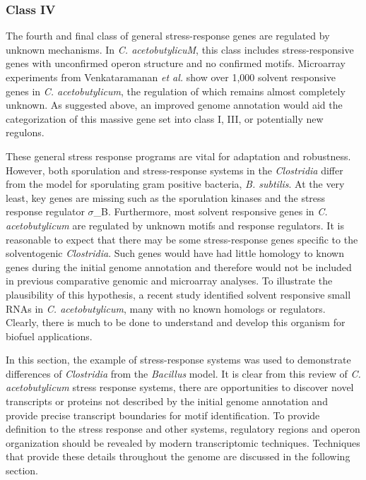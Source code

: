 \subsubsection{Class IV}
The fourth and final class of general stress-response genes are regulated by unknown mechanisms.\cite{11} In \textit{C. acetobutylicuM}, this class includes stress-responsive genes with unconfirmed operon structure and no confirmed motifs. Microarray experiments from Venkataramanan \textit{et al.} show over 1,000 solvent responsive genes in \textit{C. acetobutylicum}, the regulation of which remains almost completely unknown.\cite{42} As suggested above, an improved genome annotation would aid the categorization of this massive gene set into class I, III, or potentially new regulons.

These general stress response programs are vital for adaptation and robustness. However, both sporulation and stress-response systems in the \textit{Clostridia} differ from the model for sporulating gram positive bacteria, \textit{B. subtilis}.\cite{126} At the very least, key genes are missing such as the sporulation kinases and the stress response regulator $\sigma$_B.\cite{126} Furthermore, most solvent responsive genes in \textit{C. acetobutylicum} are regulated by unknown motifs and response regulators.\cite{42} It is reasonable to expect that there may be some stress-response genes specific to the solventogenic \textit{Clostridia}. Such genes would have had little homology to known genes during the initial genome annotation and therefore would not be included in previous comparative genomic and microarray analyses.\cite{91,42} To illustrate the plausibility of this hypothesis, a recent study identified solvent responsive small RNAs in \textit{C. acetobutylicum}, many with no known homologs or regulators.\cite{39} Clearly, there is much to be done to understand and develop this organism for biofuel applications.

In this section, the example of stress-response systems was used to demonstrate differences of \textit{Clostridia} from the \textit{Bacillus} model. It is clear from this review of \textit{C. acetobutylicum} stress response systems, there are opportunities to discover novel transcripts or proteins not described by the initial genome annotation and provide precise transcript boundaries for motif identification. To provide definition to the stress response and other systems, regulatory regions and operon organization should be revealed by modern transcriptomic techniques. Techniques that provide these details throughout the genome are discussed in the following section.

